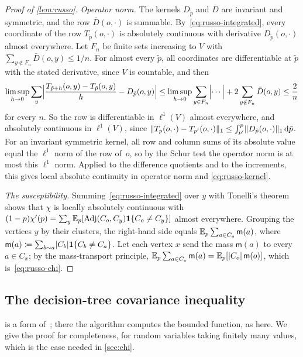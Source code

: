 \begin{proof}[Proof of \cref{lem:russo}]
\emph{Operator norm.} The kernels $D_{\tilde p}$ and $\bar D$ are invariant and symmetric, and the row
$\bar D(o,\cdot)$ is summable. By~\eqref{eq:russo-integrated}, every coordinate of the row
$T_{\tilde p}(o,\cdot)$ is absolutely continuous with derivative $D_{\tilde p}(o,\cdot)$ almost everywhere. Let $F_n$ be
finite sets increasing to $V$ with $\sum_{y\notin F_n}\bar D(o,y)\le1/n$. For almost every $\tilde p$, all
coordinates are differentiable at $\tilde p$ with the stated derivative, since $V$ is countable, and then
\begin{equation*}
  \limsup_{h\to0}\sum_y\Bigl|\frac{T_{\tilde p+h}(o,y)-T_{\tilde p}(o,y)}h-D_{\tilde p}(o,y)\Bigr|
  \le\limsup_{h\to0}\sum_{y\in F_n}\Bigl|\cdots\Bigr|+2\sum_{y\notin F_n}\bar D(o,y)\le\frac2n
\end{equation*}
for every $n$. So the row is differentiable in $\ell^1(V)$ almost everywhere, and absolutely continuous
in $\ell^1(V)$, since $\lVert T_p(o,\cdot)-T_{p'}(o,\cdot)\rVert_1\le\int_{p'}^p\lVert D_{\tilde p}(o,\cdot)\rVert_1\,\mathrm{d}\tilde p$. For an
invariant symmetric kernel, all row and column sums of its absolute value equal the $\ell^1$ norm of
the row of~$o$, so by the Schur test the operator norm is at most this $\ell^1$ norm. Applied to the
difference quotients and to the increments, this gives local absolute continuity in operator norm and
\eqref{eq:russo-kernel}.

\emph{The susceptibility.} Summing~\eqref{eq:russo-integrated} over $y$ with Tonelli's theorem shows that
$\chi$ is locally absolutely continuous with
$(1-p)\chi'(p)=\sum_y\mathbb E_p[\operatorname{Adj}(C_o,C_y)\mathbf{1}\{C_o\neq C_y\}]$ almost everywhere. Grouping the vertices $y$
by their clusters, the right-hand side equals $\mathbb E_p\sum_{a\in C_o}\mathsf m(a)$, where
$\mathsf m(a)\coloneqq\sum_{b\sim a}\lvert C_b\rvert\mathbf{1}\{C_b\neq C_a\}$. Let each vertex $x$ send the mass $\mathsf m(a)$
to every $a\in C_x$; by the mass-transport principle,
$\mathbb E_p\sum_{a\in C_o}\mathsf m(a)=\mathbb E_p[\lvert C_o\rvert\,\mathsf m(o)]$, which is~\eqref{eq:russo-chi}.
\end{proof}

\subsection{The decision-tree covariance inequality}\label{app:osss}

 is a form of~\cite[Section~3.3, Equation~(6)]{OSSS05}; there the algorithm computes the
bounded function, as here. We give the proof for completeness, for random variables taking finitely many
values, which is the case needed in \cref{sec:chi}.

